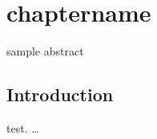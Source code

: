 

\chapter{chaptername} %

\label{chap1} %


\begin{singlespace}


\begin{chapabstract}
    sample abstract
\end{chapabstract}


\end{singlespace}

\clearpage
\setcounter{page}{1}


	\section{Introduction}

test. \citet{acemoglu_automation_2019} \dots


